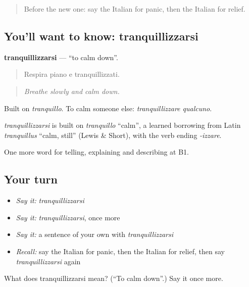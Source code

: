 \label{lesson:IT-C475-tranquillizzarsi}



\begin{quote}
Before the new one: say the Italian for panic, then the Italian for relief.
\end{quote}

\subsection*{You'll want to know: tranquillizzarsi}
\textbf{tranquillizzarsi} — \textquotedblleft{}to calm down\textquotedblright{}.

\begin{quote}
Respira piano e tranquillizzati.
\end{quote}

\begin{quote}
\emph{Breathe slowly and calm down.}
\end{quote}

Built on \emph{tranquillo}. To calm someone else: \emph{tranquillizzare qualcuno}.

\begin{cousinweb}
\emph{tranquillizzarsi} is built on \emph{tranquillo} \textquotedblleft{}calm\textquotedblright{}, a learned borrowing from Latin \emph{tranquillus} \textquotedblleft{}calm, still\textquotedblright{} (Lewis \& Short), with the verb ending \emph{-izzare}.
\end{cousinweb}

\begin{grammarlens}[title={What you've built}]
One more word for telling, explaining and describing at B1.
\end{grammarlens}

\subsection*{Your turn}
\begin{itemize}
\raggedright
  \item \emph{Say it:} \emph{tranquillizzarsi}
  \item \emph{Say it:} \emph{tranquillizzarsi}, once more
  \item \emph{Say it:} a sentence of your own with \emph{tranquillizzarsi}
  \item \emph{Recall:} say the Italian for panic, then the Italian for relief, then say \emph{tranquillizzarsi} again
\end{itemize}

\begin{tcolorbox}[breakable,colback=teal!4,colframe=teal!35!black,title={Before you move on}]
What does tranquillizzarsi mean? (\textquotedblleft{}To calm down\textquotedblright{}.) Say it once more.
\end{tcolorbox}
